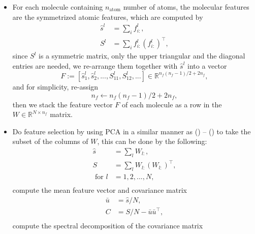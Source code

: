 \documentclass[12pt]{article}
\begin{document}
\begin{itemize}
    \item For each molecule containing $n_\text{atom}$ number of atoms, the molecular features are the symmetrized atomic features, which are computed by
        \begin{equation}
			\label{eq:acsf}
            \begin{split}
                \hat{s}^l &= \sum_i f^l_{i:}, \\
                S^l &= \sum_i f^l_{i:}(f^l_{i:})^\top,
            \end{split}
        \end{equation}
        since $S^l$ is a symmetric matrix, only the upper triangular and the diagonal entries are needed, we re-arrange them together with $\hat{s}^l$ into a vector
        \begin{equation}
			F := [\hat{s}^l_1, \hat{s}^l_2, ..., S^l_{11}, S^l_{12}, ... ] \in \mathbb{R}^{n_f(n_f-1)/2 + 2n_f},
        \end{equation}
    	and for simplicity, re-assign
    	\begin{equation}
    		n_f \leftarrow n_f(n_f-1)/2 + 2n_f,
    	\end{equation}
    	then we stack the feature vector $F$ of each molecule as a row in the $W \in \mathbb{R}^{N \times n_f}$ matrix.
    \item Do feature selection by using PCA in a similar manner as () -- () to take the subset of the columns of $W$, this can be done by the following:
	    \begin{equation}
			\label{eq:pca_mol_start}
			\begin{split}
				\hat{s} &= \sum_l W_{l:}, \\
				S &= \sum_l W_{l:}(W_{l:})^\top, \\
				\text{ for } l &= 1,2,...,N, \\
			\end{split}
	    \end{equation}
		compute the mean feature vector and covariance matrix
		\begin{equation}
			\begin{split}
				\bar{u} &= \hat{s}/N, \\
				C &= S/N - \bar{u}\bar{u}^\top, \\			
			\end{split}
		\end{equation}
		compute the spectral decomposition of the covariance matrix

\end{itemize}
\end{document}
